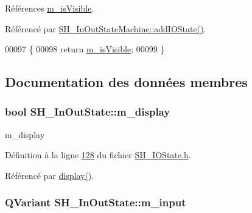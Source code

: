 Références \hyperlink{classSH__InOutState_a8fd66b185c9a55f0e84daa97e2acf53a}{m\-\_\-is\-Visible}.



Référencé par \hyperlink{classSH__InOutStateMachine_a2528cffddbe6f98c32ebef41423c0118}{S\-H\-\_\-\-In\-Out\-State\-Machine\-::add\-I\-O\-State()}.


\begin{DoxyCode}
00097                                \{
00098     \textcolor{keywordflow}{return} \hyperlink{classSH__InOutState_a8fd66b185c9a55f0e84daa97e2acf53a}{m\_isVisible};
00099 \}
\end{DoxyCode}


\subsection{Documentation des données membres}
\hypertarget{classSH__InOutState_a3351fa53593266a1ae4334d33d0b1610}{
\subsubsection[{m\-\_\-display}]{\setlength{\rightskip}{0pt plus 5cm}bool S\-H\-\_\-\-In\-Out\-State\-::m\-\_\-display\hspace{0.3cm}{\ttfamily [private]}}}\label{classSH__InOutState_a3351fa53593266a1ae4334d33d0b1610}


m\-\_\-display 



Définition à la ligne \hyperlink{SH__IOState_8h_source_l00128}{128} du fichier \hyperlink{SH__IOState_8h_source}{S\-H\-\_\-\-I\-O\-State.\-h}.



Référencé par \hyperlink{classSH__InOutState_a616f88b20478b81b2927a9ddc2b4f521}{display()}.

\hypertarget{classSH__InOutState_ae43d6fdc62047f285913837648a1e883}{
\subsubsection[{m\-\_\-input}]{\setlength{\rightskip}{0pt plus 5cm}Q\-Variant S\-H\-\_\-\-In\-Out\-State\-::m\-\_\-input\hspace{0.3cm}{\ttfamily [private]}}}\label{classSH__InOutState_ae43d6fdc62047f285913837648a1e883}


